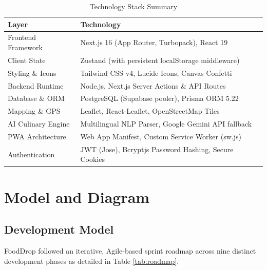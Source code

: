 \documentclass[12pt,a4paper]{report}
\begin{document}
\begin{table}[h!]
\centering
\caption{Technology Stack Summary}
\label{tab:tech_stack}
\begin{tabular}{|l|p{10cm}|}
\hline
\textbf{Layer} & \textbf{Technology} \\
\hline
Frontend Framework & Next.js 16 (App Router, Turbopack), React 19 \\
\hline
Client State & Zustand (with persistent localStorage middleware) \\
\hline
Styling \& Icons & Tailwind CSS v4, Lucide Icons, Canvas Confetti \\
\hline
Backend Runtime & Node.js, Next.js Server Actions \& API Routes \\
\hline
Database \& ORM & PostgreSQL (Supabase pooler), Prisma ORM 5.22 \\
\hline
Mapping \& GPS & Leaflet, React-Leaflet, OpenStreetMap Tiles \\
\hline
AI Culinary Engine & Multilingual NLP Parser, Google Gemini API fallback \\
\hline
PWA Architecture & Web App Manifest, Custom Service Worker (sw.js) \\
\hline
Authentication & JWT (Jose), Bcryptjs Password Hashing, Secure Cookies \\
\hline
\end{tabular}
\end{table}

\section{Model and Diagram}

\subsection{Development Model}
FoodDrop followed an iterative, Agile-based sprint roadmap across nine distinct development phases as detailed in Table \ref{tab:roadmap}.
\end{document}
